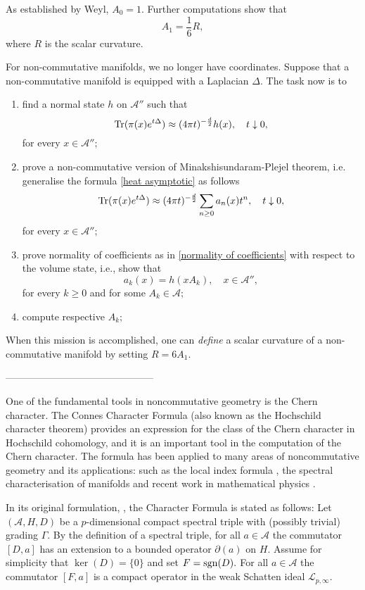 \documentclass{article}
\begin{document}
As established by Weyl, $A_0=1.$ Further computations show that
$$A_1=\frac16 R,$$
where $R$ is the scalar curvature.

For non-commutative manifolds, we no longer have coordinates. Suppose that a non-commutative manifold is equipped with a Laplacian $\Delta.$ The task now is to
\begin{enumerate}
\item find a normal state $h$ on $\mathcal{A}''$ such that
$${\rm Tr}(\pi(x)e^{t\Delta})\approx (4\pi t)^{-\frac{d}{2}} h(x),\quad t\downarrow0,$$
for every $x\in\mathcal{A}'';$
\item prove a non-commutative version of Minakshisundaram-Plejel theorem, i.e. generalise the formula \eqref{heat asymptotic} as follows
$${\rm Tr}(\pi(x)e^{t\Delta})\approx (4\pi t)^{-\frac{d}{2}} \sum_{n\geq0}a_n(x)t^n,\quad t\downarrow0,$$
for every $x\in\mathcal{A}'';$
\item prove normality of coefficients as in \eqref{normality of coefficients} with respect to the volume state, i.e., show that
$$a_k(x)=h(xA_k),\quad x\in\mathcal{A}'',$$
for every $k\geq0$ and for some $A_k\in\mathcal{A};$ 
\item compute respective $A_k;$
\end{enumerate}
When this mission is accomplished, one can {\it define} a scalar curvature of a non-commutative manifold by setting $R=6A_1.$



---------------------------------------------


One of the fundamental tools in noncommutative geometry is the Chern character. The Connes Character Formula (also known as the Hochschild character theorem) provides an expression for the class of the Chern character in Hochschild cohomology, and it is an important    tool in the computation of the Chern character. The formula has been applied to many areas     of noncommutative geometry and its applications: such as the local index formula \cite{Connes-Moscovici}, the spectral characterisation of manifolds \cite{Connes-reconstruction} and recent work in mathematical physics \cite{Connes-Chamseddine-Mukhanov-quanta-of-geometry-2015}.

In its original formulation, \cite{Connes-original-spectral-1995}, the Character Formula is stated as follows: Let $(\mathcal{A},H,D)$ be a $p$-dimensional compact spectral triple     with (possibly trivial) grading $\Gamma.$ By the definition of a spectral triple, for all $a \in \mathcal{A}$ the commutator $[D,a]$ has an extension to a bounded operator $\partial(a)$ on $H.$ Assume for simplicity that $\ker(D)=\{0\}$ and set $F={\rm sgn}(D).$ For all $a \in \mathcal{A}$ the commutator $[F,a]$ is a compact operator in the weak Schatten ideal $\mathcal{L}_{p,\infty}.$ 
\end{document}
